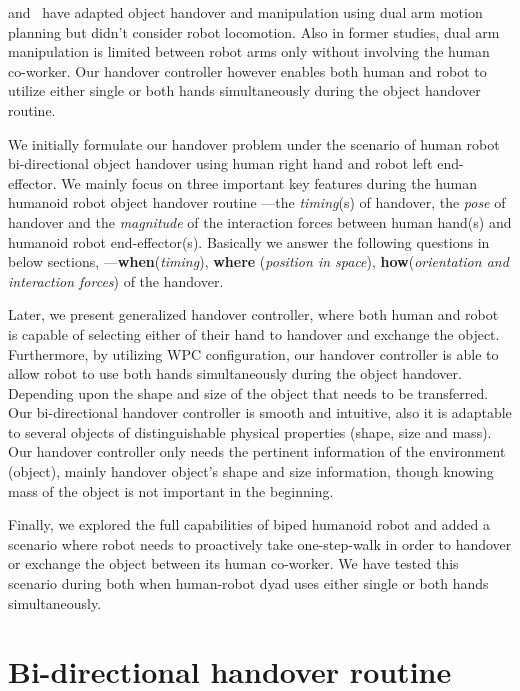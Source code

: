 \cite{vahrenkamp2009humanoid, vezzani2017novel} and~\cite{kim2004advanced} have adapted object handover and manipulation using dual arm motion planning but didn't consider robot locomotion. Also in former studies, dual arm manipulation is limited between robot arms only without involving the human co-worker. Our handover controller however enables both human and robot to utilize either single or both hands simultaneously during the object handover routine.

We initially formulate our handover problem under the scenario of human robot bi-directional object handover using human right hand and robot left end-effector. We mainly focus on three important key features during the human humanoid robot object handover routine ---the \textit{timing}(s) of handover, the \textit{pose} of handover and the \textit{magnitude} of the interaction forces between human hand(s) and humanoid robot end-effector(s). Basically we answer the following questions in below sections, ---\textbf{when}(\textit{timing}), \textbf{where} (\textit{position in space}), \textbf{how}(\textit{orientation and interaction forces}) of the handover.


Later, we present generalized handover controller, where both human and robot is capable of selecting either of their hand to handover and exchange the object. Furthermore, by utilizing WPC configuration, our handover controller is able to allow robot to use both hands simultaneously during the object handover. Depending upon the shape and size of the object that needs to be transferred. Our bi-directional handover controller is smooth and intuitive, also it is adaptable to several objects of distinguishable physical properties (shape, size and mass). Our handover controller only needs the pertinent information of the environment (object), mainly handover object's shape and size information, though knowing mass of the object is not important in the beginning.

Finally, we explored the full capabilities of biped humanoid robot and added a scenario where robot needs to proactively take one-step-walk in order to handover or exchange the object between its human co-worker. We have tested this scenario during both when human-robot dyad uses either single or both hands simultaneously.

\clearpage

\section{Bi-directional handover routine}\label{handover routine}

